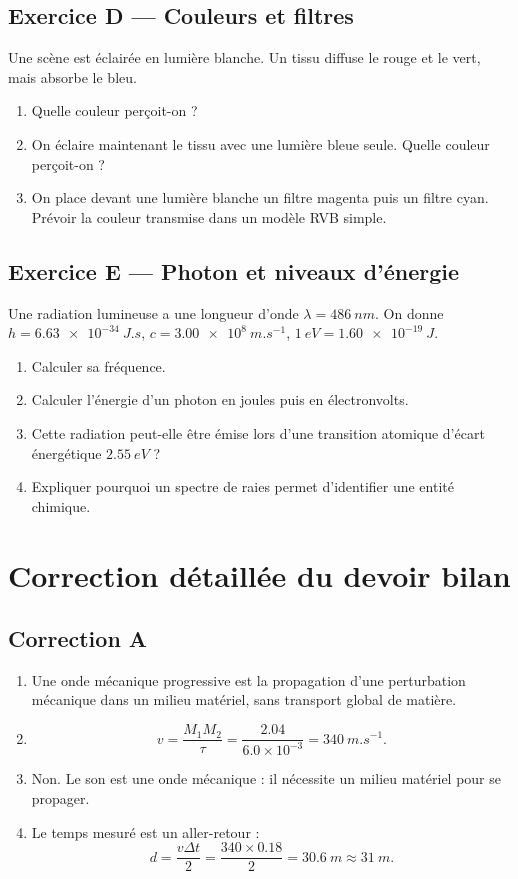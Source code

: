 \documentclass[11pt,a4paper]{article}
\begin{document}
\subsection*{Exercice D — Couleurs et filtres}
Une scène est éclairée en lumière blanche. Un tissu diffuse le rouge et le vert, mais absorbe le bleu.
\begin{enumerate}[label=\arabic*)]
  \item Quelle couleur perçoit-on ?
  \item On éclaire maintenant le tissu avec une lumière bleue seule. Quelle couleur perçoit-on ?
  \item On place devant une lumière blanche un filtre magenta puis un filtre cyan. Prévoir la couleur transmise dans un modèle RVB simple.
\end{enumerate}

\subsection*{Exercice E — Photon et niveaux d'énergie}
Une radiation lumineuse a une longueur d'onde $\lambda=\SI{486}{nm}$. On donne $h=\SI{6.63e-34}{J.s}$, $c=\SI{3.00e8}{m.s^{-1}}$, $\SI{1}{eV}=\SI{1.60e-19}{J}$.
\begin{enumerate}[label=\arabic*)]
  \item Calculer sa fréquence.
  \item Calculer l'énergie d'un photon en joules puis en électronvolts.
  \item Cette radiation peut-elle être émise lors d'une transition atomique d'écart énergétique $\SI{2.55}{eV}$ ?
  \item Expliquer pourquoi un spectre de raies permet d'identifier une entité chimique.
\end{enumerate}

\newpage

\section*{Correction détaillée du devoir bilan}

\subsection*{Correction A}
\begin{enumerate}[label=\arabic*)]
  \item Une onde mécanique progressive est la propagation d'une perturbation mécanique dans un milieu matériel, sans transport global de matière.
  \item
  \[
  v=\frac{M_1M_2}{\tau}=\frac{2.04}{6.0\times10^{-3}}=\SI{340}{m.s^{-1}}.
  \]
  \item Non. Le son est une onde mécanique : il nécessite un milieu matériel pour se propager.
  \item Le temps mesuré est un aller-retour :
  \[
  d=\frac{v\Delta t}{2}=\frac{340\times0.18}{2}=\SI{30.6}{m}\approx\SI{31}{m}.
  \]
\end{enumerate}
\end{document}

